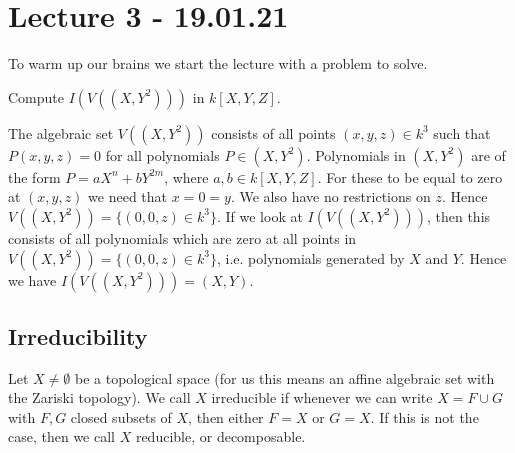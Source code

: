 \section{Lecture 3 - 19.01.21}

To warm up our brains we start the lecture with a problem to solve. 
\begin{problem}
Compute $I(V((X, Y^2)))$ in $k[X, Y, Z]$. 
\end{problem}
\begin{solution}
The algebraic set $V((X, Y^2))$ consists of all points $(x, y, z)\in k^3$ such that $P(x, y, z)=0$ for all polynomials $P\in (X, Y^2)$. Polynomials in $(X, Y^2)$ are of the form $P=aX^n + bY^{2m}$, where $a, b\in k[X, Y, Z]$. For these to be equal to zero at $(x, y, z)$ we need that $x=0=y$. We also have no restrictions on $z$. Hence $V((X, Y^2)) = \{ (0, 0, z)\in k^3 \}$. If we look at $I(V((X, Y^2)))$, then this consists of all polynomials which are zero at all points in $V((X, Y^2)) = \{ (0, 0, z)\in k^3 \}$, i.e. polynomials generated by $X$ and $Y$. Hence we have $I(V((X, Y^2))) = (X, Y)$. 
\end{solution}

\subsection{Irreducibility}

\begin{definition}
Let $X\neq \emptyset$ be a topological space (for us this means an affine algebraic set with the Zariski topology). We call $X$ irreducible if whenever we can write $X=F\cup G$ with $F, G$ closed subsets of $X$, then either $F=X$ or $G=X$. If this is not the case, then we call $X$ reducible, or decomposable. 
\end{definition}


